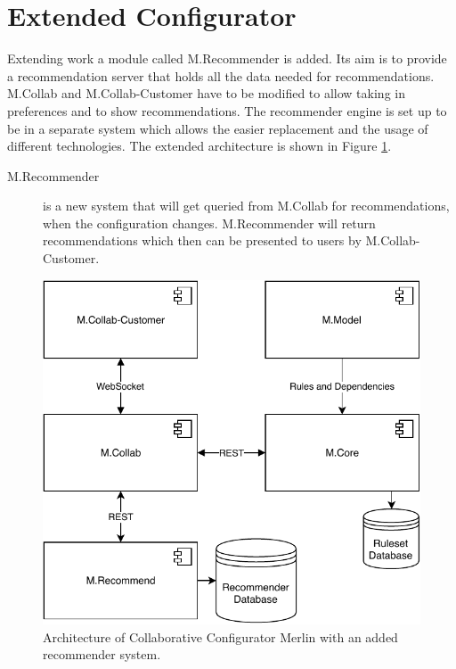 \section{Extended Configurator}
\label{sec:Concept:ExtendedConfigurator}

Extending \citeauthor{raabKollaborativeProduktkonfigurationEchtzeit2019} work a module called M.Recommender is added. Its aim is to provide a recommendation server that holds all the data needed for recommendations. M.Collab and M.Collab-Customer have to be modified to allow taking in preferences and to show  recommendations. The recommender engine is set up to be in a separate system which allows the easier replacement and the usage of different technologies. The extended architecture is shown in Figure \ref{fig:Concept:RecommenderForCollaborativeConfiguratorMerlin}.

\begin{description}
    \item[M.Recommender] is a new system that will get queried from M.Collab for recommendations, when the configuration changes. M.Recommender will return recommendations which then can be presented to users by M.Collab-Customer.
\end{description}

\begin{figure}
    \centering
    \includegraphics{./figures/MerlinCollabRecommender.pdf}
    \caption{Architecture of Collaborative Configurator Merlin with an added recommender system.}
    \label{fig:Concept:RecommenderForCollaborativeConfiguratorMerlin}
\end{figure}